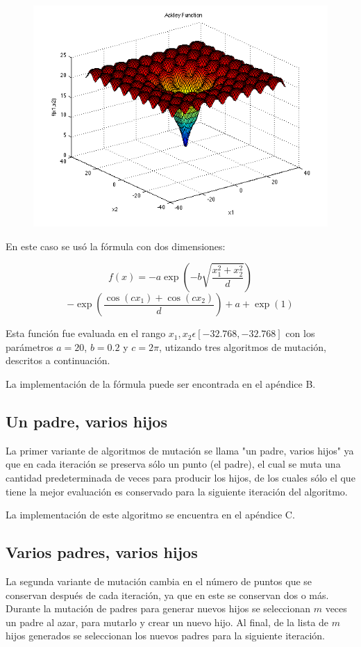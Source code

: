 \documentclass[sigconf,authorversion,nonacm]{acmart}
\begin{document}
\begin{figure}[H]
  \centering
  \includegraphics[width=\linewidth]{ackley.png}
\end{figure}

En este caso se usó la fórmula con dos dimensiones:

$$f(x) = -a \exp \left(-b \sqrt{\frac{x_1^2 + x_2^2}{d}} \right)$$
$$-\exp \left(\frac{\cos (c x_1) + \cos (c x_2)}{d} \right) + a + \exp (1)$$

Esta función fue evaluada en el rango $x_1, x_2 \epsilon [-32.768, -32.768]$ con los parámetros $a = 20$, $b = 0.2$ y $c = 2\pi$, utizando tres algoritmos de mutación, descritos a continuación.

La implementación de la fórmula puede ser encontrada en el apéndice B.

\subsection{Un padre, varios hijos}
La primer variante de algoritmos de mutación se llama "un padre, varios hijos" ya que en cada iteración se preserva sólo un punto (el padre), el cual se muta una cantidad predeterminada de veces para producir los hijos, de los cuales sólo el que tiene la mejor evaluación es conservado para la siguiente iteración del algoritmo.

La implementación de este algoritmo se encuentra en el apéndice C.

\subsection{Varios padres, varios hijos}
La segunda variante de mutación cambia en el número de puntos que se conservan después de cada iteración, ya que en este se conservan dos o más. Durante la mutación de padres para generar nuevos hijos se seleccionan $m$ veces un padre al azar, para mutarlo y crear un nuevo hijo. Al final, de la lista de $m$ hijos generados se seleccionan los nuevos padres para la siguiente iteración.
\end{document}
